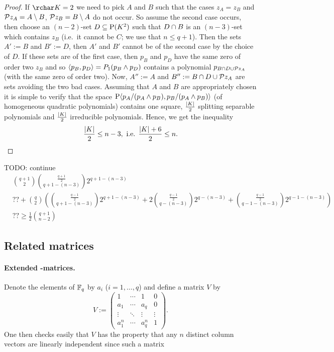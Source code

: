 \begin{proof}
    If $\rchar K = 2$ we need to pick $A$ and $B$ such that the cases 
    $z_A=z_B$ and $\set{z_A}=A\setminus B$, $\set{z_B}=B\setminus A$ do not occur. So assume the second case occurs, then choose an $(n-2)$-set $D\setleq\P(K^2)$ such that $D\cap B$ is an $(n-3)$-set which contains $z_B$ (i.e.~it cannot be $C$; we use that $n\leq q+1$). Then the sets $A':=B$ and $B':=D$, then $A'$ and $B'$ cannot be of the second case by the choice of $D$. If these sets are of the first case, then $p_B$ and $p_D$ have the same zero of order two $z_B$ and so $\gen{p_B,p_D}=P_1(p_B\meet p_D)$ contains a polynomial $p_{B\setmeet D\setjoin\set{z_A}}$ (with the same zero of order two). Now, $A'':=A$ and $B'':=B\setmeet D\setjoin\set{z_A}$ are sets avoiding the two bad cases.
    Assuming that $A$ and $B$ are appropriately chosen it is simple to verify that the space $\P\gen{p_A/(p_A\meet p_B),p_B/(p_A\meet p_B)}$ (of homogeneous quadratic polynomials) contains one square, $\frac{\left|K\right|} 2$ splitting separable polynomials and $\frac{\left|K\right|} 2$ irreducible polynomials.
    Hence, we get the inequality
    $$
    \frac{\left|K\right|} 2 \leq n-3, \text{ i.e. } \frac{\left|K\right|+6} 2\leq n.
    $$
\end{proof}

TODO: continue
\begin{align*}
    &\binom{q+1} 2\binom{\frac{q+1} 2}{q+1-(n-3)} 2^{q+1-(n-3)}\\
    &??+\binom q 2\left(\binom{\frac{q-1} 2}{q+1-(n-3)}2^{q+1-(n-3)}+2\binom{\frac{q-1} 2}{q-(n-3)}2^{q-(n-3)}+\binom{\frac{q-1} 2}{q-1-(n-3)}2^{q-1-(n-3)}\right)\\
    &??\geq \frac 1 2\binom{q+1}{n-2}
\end{align*}

\subsection{Related matrices}

\paragraph{Extended -matrices.}
Denote the elements of $\mathbb{F}_{q}$ by $a_i$ ($i=1,\ldots,q$) and define a matrix $V$ by
$$
V :=
\begin{pmatrix}
    1      & \cdots & 1      & 0      \\
    a_1    & \cdots & a_q    & 0      \\
    \vdots & \ddots & \vdots & \vdots \\
    a_1^n  & \cdots & a_q^n  & 1
\end{pmatrix}\textrm{.}
$$
One then checks easily that $V$ has the property that any $n$ distinct column vectors are linearly independent since such a matrix

